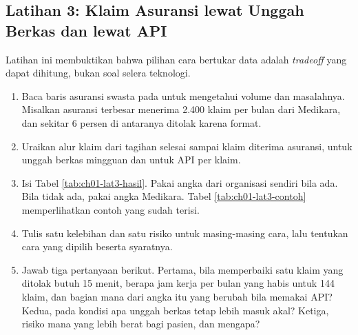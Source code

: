 \subsection*{Latihan 3: Klaim Asuransi lewat Unggah Berkas dan lewat API}

Latihan ini membuktikan bahwa pilihan cara bertukar data adalah
\textit{tradeoff} yang dapat dihitung, bukan soal selera teknologi.

\begin{enumerate}
  \item Baca baris asuransi swasta pada
         untuk
        mengetahui volume dan masalahnya. Misalkan asuransi terbesar menerima
        2.400 klaim per bulan dari Medikara, dan sekitar 6 persen di antaranya
        ditolak karena format.
  \item Uraikan alur klaim dari tagihan selesai sampai klaim diterima asuransi,
        untuk unggah berkas mingguan dan untuk API per klaim.
  \item Isi Tabel \ref{tab:ch01-lat3-hasil}. Pakai angka dari organisasi sendiri
        bila ada. Bila tidak ada, pakai angka Medikara. Tabel
        \ref{tab:ch01-lat3-contoh} memperlihatkan contoh yang sudah terisi.
  \item Tulis satu kelebihan dan satu risiko untuk masing-masing cara, lalu
        tentukan cara yang dipilih beserta syaratnya.
  \item Jawab tiga pertanyaan berikut. Pertama, bila memperbaiki satu klaim yang
        ditolak butuh 15 menit, berapa jam kerja per bulan yang habis untuk 144
        klaim, dan bagian mana dari angka itu yang berubah bila memakai API?
        Kedua, pada kondisi apa unggah berkas tetap lebih masuk akal? Ketiga,
        risiko mana yang lebih berat bagi pasien, dan mengapa?
\end{enumerate}

